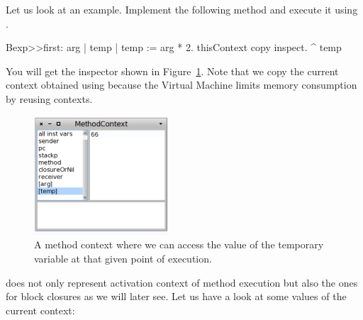 \documentclass[a4paper,10pt,twoside]{book}
\begin{document}
Let us look at an example. Implement the following method and execute it using .

\begin{code}{}
Bexp>>first: arg
	| temp |
	temp := arg * 2.
	thisContext copy inspect.
	^ temp
\end{code}

You will get the inspector shown in Figure~\ref{oneContext}. Note that we copy the current context obtained using  because the Virtual Machine limits memory consumption by reusing contexts.

\begin{figure}
\begin{center}\includegraphics[width=5cm]{OneContext}
\caption{A method context where we can access the value of the temporary variable  at that given point of execution.\label{oneContext}}
\end{center}
\end{figure}

 does not only represent activation context of method execution but also
the ones for block closures as we will later see. Let us have a look at some values of the current context:
\end{document}
